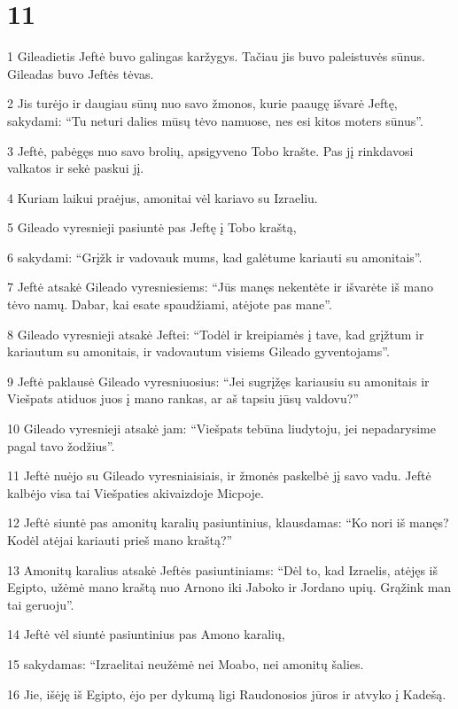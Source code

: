 \chapter{11}

\par 1 Gileadietis Jeftė buvo galingas karžygys. Tačiau jis buvo paleistuvės sūnus. Gileadas buvo Jeftės tėvas. 
\par 2 Jis turėjo ir daugiau sūnų nuo savo žmonos, kurie paaugę išvarė Jeftę, sakydami: “Tu neturi dalies mūsų tėvo namuose, nes esi kitos moters sūnus”. 
\par 3 Jeftė, pabėgęs nuo savo brolių, apsigyveno Tobo krašte. Pas jį rinkdavosi valkatos ir sekė paskui jį. 
\par 4 Kuriam laikui praėjus, amonitai vėl kariavo su Izraeliu. 
\par 5 Gileado vyresnieji pasiuntė pas Jeftę į Tobo kraštą, 
\par 6 sakydami: “Grįžk ir vadovauk mums, kad galėtume kariauti su amonitais”. 
\par 7 Jeftė atsakė Gileado vyresniesiems: “Jūs manęs nekentėte ir išvarėte iš mano tėvo namų. Dabar, kai esate spaudžiami, atėjote pas mane”. 
\par 8 Gileado vyresnieji atsakė Jeftei: “Todėl ir kreipiamės į tave, kad grįžtum ir kariautum su amonitais, ir vadovautum visiems Gileado gyventojams”. 
\par 9 Jeftė paklausė Gileado vyresniuosius: “Jei sugrįžęs kariausiu su amonitais ir Viešpats atiduos juos į mano rankas, ar aš tapsiu jūsų valdovu?” 
\par 10 Gileado vyresnieji atsakė jam: “Viešpats tebūna liudytoju, jei nepadarysime pagal tavo žodžius”. 
\par 11 Jeftė nuėjo su Gileado vyresniaisiais, ir žmonės paskelbė jį savo vadu. Jeftė kalbėjo visa tai Viešpaties akivaizdoje Micpoje. 
\par 12 Jeftė siuntė pas amonitų karalių pasiuntinius, klausdamas: “Ko nori iš manęs? Kodėl atėjai kariauti prieš mano kraštą?” 
\par 13 Amonitų karalius atsakė Jeftės pasiuntiniams: “Dėl to, kad Izraelis, atėjęs iš Egipto, užėmė mano kraštą nuo Arnono iki Jaboko ir Jordano upių. Grąžink man tai geruoju”. 
\par 14 Jeftė vėl siuntė pasiuntinius pas Amono karalių, 
\par 15 sakydamas: “Izraelitai neužėmė nei Moabo, nei amonitų šalies. 
\par 16 Jie, išėję iš Egipto, ėjo per dykumą ligi Raudonosios jūros ir atvyko į Kadešą. 

